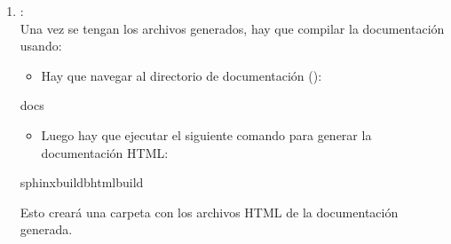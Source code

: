 \documentclass[a4paper,10pt,spanish]{sphinxmanual}
\begin{document}
\begin{enumerate}
\begin{itemize}
\item {} 
\sphinxAtStartPar
{}: Genera un archivo separado para cada módulo detectado en lugar de consolidar toda la documentación en un único archivo.

\item {} 
\sphinxAtStartPar
{}: Configura la extensión de los archivos generados como . Si esta opción no se especifica, el valor predeterminado es .

\end{itemize}

\sphinxAtStartPar
Al ejecutar el comando sphinx\sphinxhyphen{}apidoc, en nuestro caso los archivos generados son:
\begin{itemize}
\item {} 
\sphinxAtStartPar
math\_operations

\item {} 
\sphinxAtStartPar
modules

\end{itemize}

\item {} 
\sphinxAtStartPar
{}:\\
Una vez se tengan los archivos generados, hay que compilar la documentación usando:
\begin{itemize}
\item {} 
\sphinxAtStartPar
Hay que navegar al directorio de documentación ():

\end{itemize}

\begin{sphinxVerbatim}[commandchars=\\\{\}]
docs
\end{sphinxVerbatim}
\begin{itemize}
\item {} 
\sphinxAtStartPar
Luego hay que ejecutar el siguiente comando para generar la documentación HTML:

\end{itemize}

\begin{sphinxVerbatim}[commandchars=\\\{\}]
sphinx\PYGZhy{}build\PYGZhy{}bhtmlbuild
\end{sphinxVerbatim}

\sphinxAtStartPar
Esto creará una carpeta  con los archivos HTML de la documentación generada.

\end{enumerate}
\end{document}
